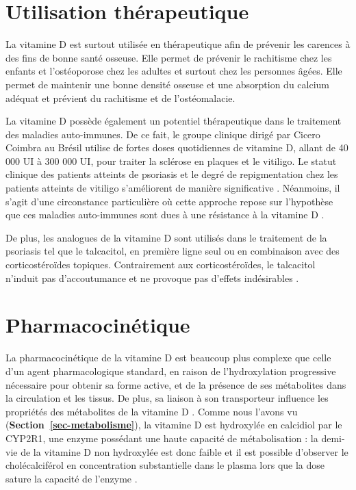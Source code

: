 \documentclass[
  a4paper,
  DIV=11,
  numbers=noendperiod,
  listof=totoc]{scrreprt}
\begin{document}
\section{Utilisation thérapeutique}\label{utilisation-thuxe9rapeutique}

La vitamine D est surtout utilisée en thérapeutique afin de prévenir les
carences à des fins de bonne santé osseuse. Elle permet de prévenir le
rachitisme chez les enfants et l'ostéoporose chez les adultes et surtout
chez les personnes âgées. Elle permet de maintenir une bonne densité
osseuse et une absorption du calcium adéquat et prévient du rachitisme
et de l'ostéomalacie.

La vitamine D possède également un potentiel thérapeutique dans le
traitement des maladies auto-immunes. De ce fait, le groupe clinique
dirigé par Cicero Coimbra au Brésil utilise de fortes doses quotidiennes
de vitamine D, allant de 40 000 UI à 300 000 UI, pour traiter la
sclérose en plaques et le vitiligo. Le statut clinique des patients
atteints de psoriasis et le degré de repigmentation chez les patients
atteints de vitiligo s'améliorent de manière significative
\autocite{Amon.2022}. Néanmoins, il s'agit d'une circonstance
particulière où cette approche repose sur l'hypothèse que ces maladies
auto-immunes sont dues à une résistance à la vitamine D
\autocite{Lemke.2021}.

De plus, les analogues de la vitamine D sont utilisés dans le traitement
de la psoriasis tel que le talcacitol, en première ligne seul ou en
combinaison avec des corticostéroïdes topiques. Contrairement aux
corticostéroïdes, le talcacitol n'induit pas d'accoutumance et ne
provoque pas d'effets indésirables \autocite{Giustina.2020}.

\section{Pharmacocinétique}\label{pharmacocinuxe9tique}

La pharmacocinétique de la vitamine D est beaucoup plus complexe que
celle d'un agent pharmacologique standard, en raison de l'hydroxylation
progressive nécessaire pour obtenir sa forme active, et de la présence
de ses métabolites dans la circulation et les tissus. De plus, sa
liaison à son transporteur  influence les propriétés des
métabolites de la vitamine D \autocite{Schoenmakers.2018}. Comme nous
l'avons vu (\textbf{Section~\ref{sec-metabolisme}}), la vitamine D est
hydroxylée en calcidiol par le CYP2R1, une enzyme possédant une haute
capacité de métabolisation : la demi-vie de la vitamine D non hydroxylée
est donc faible et il est possible d'observer le cholécalciférol en
concentration substantielle dans le plasma lors que la dose sature la
capacité de l'enzyme \autocite{Schoenmakers.2018}.
\end{document}
